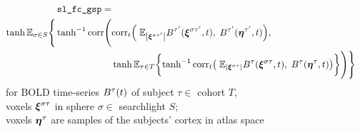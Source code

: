\documentclass[10pt]{article}
\begin{document}
\begin{equation*}
\begin{split}
  \texttt{sl\_fc\_gsp} = \\
  \hyptangent
  \mathbb{E}_{\sigma \in S} \Bigg\{ 
  \hyptangent^{-1}
  \text{corr} \Bigg( &
            \text{corr}_t\qty( \;
                       \mathbb{E}_{\qty|\vb*{\xi}^{\sigma\tau'}|} B^{\tau'}(\vb*{\xi}^{\sigma\tau'}, t), \; 
                       B^{\tau'}(\vb*{\eta}^{\tau'}, t) ), \; \\
          & \hyptangent
            \mathbb{E}_{\tau \in T} \qty\bigg{ 
            \hyptangent^{-1}
            \text{corr}_t\qty\big( \; 
                       \mathbb{E}_{\qty|\vb*{\xi}^{\sigma\tau}|}B^\tau(\vb*{\xi}^{\sigma\tau}, t), \;
                       B^\tau(\vb*{\eta}^\tau, t) ) }
            \Bigg) \Bigg\} 
\end{split}            
\end{equation*}
for BOLD time-series $B^\tau\qty(t)$ of subject $\tau \in$ cohort $T$, \\
voxels $\vb*{\xi}^{\sigma\tau}$ in sphere $\sigma \in$ searchlight $S$; \\
voxels $\vb*{\eta}^\tau$ are samples of the subjects' cortex in atlas space
\end{document}
